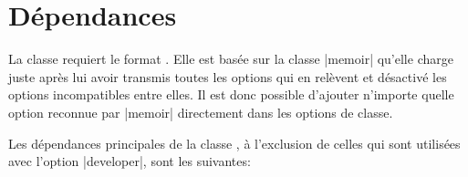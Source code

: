 

\section{Dépendances}

La classe \frenchlaw requiert le format \LaTeXe. Elle est basée sur la classe |memoir| qu'elle charge juste après lui avoir transmis toutes les options qui en relèvent et désactivé les options incompatibles entre elles. Il est donc possible d'ajouter n'importe quelle option reconnue par |memoir| directement dans les options de classe.

\begin{noprint}
\ProcessOptionsX\relax
\if@marginalia\if@twocolumn\@marginaliafalse\fi\fi
\if@stockavi\if@elevenpoints\@tenpointstrue\@elevenpointsfalse\fi\fi
\if@stockavi\if@twelvepoints\@tenpointstrue\@twelvepointsfalse\fi\fi
\if@stockavi\if@fourteenpoints\@tenpointstrue\@fourteenpointsfalse\fi\fi
\def\baselinestretch{\custom@baselinestretch}\selectfont
\end{noprint}

Les dépendances principales de la classe \frenchlaw, à l'exclusion de celles qui sont utilisées avec l'option |developer|, sont les suivantes:

